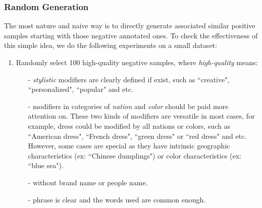 \subsubsection{Random Generation}
The most nature and naive way is to directly generate associated similar positive samples starting with those negative annotated ones. %
To check the effectiveness of this simple idea, we do the following experiments on a small dataset:
\begin{enumerate}
	\item Randomly select 100 high-quality negative samples, where \textit{high-quality} means:
	\begin{itemize}
		\item [-] \textit{stylistic} modifiers are clearly defined if exist, such as ``creative", ``personalized", ``popular" and etc.
		\item [-] modifiers in categories of \textit{nation} and \textit{color} should be paid more attention on. These two kinds of modifiers are versatile in most cases, for example, dress could be modified by all nations or colors, such as ``American dress", ``French dress", ``green dress" or ``red dress" and etc. However, some cases are special as they have intrinsic geographic characteristics (ex: ``Chinese dumplings") or color characteristics (ex: ``blue sea").
		\item [-] without brand name or people name. %
		\item [-] phrase is clear and the words used are common enough.	
	\end{itemize}

\end{enumerate}
